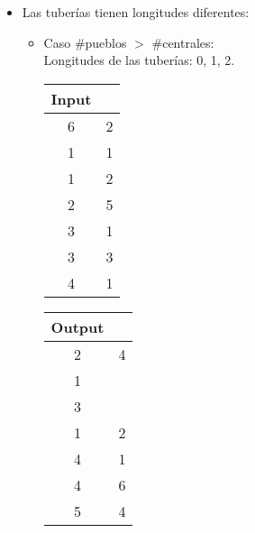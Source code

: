 \documentclass[11pt, a4paper, twoside]{article}
\begin{document}
\begin{itemize}
	\item Las tuberías tienen longitudes diferentes: 
		    \begin{itemize}
				\item Caso \#pueblos $>$ \#centrales: \\
				   Longitudes de las tuberías: 0, 1, 2. \\
				   \begin{minipage}{0.2\textwidth}
						\begin{tabular}{cc}
							   Input \\
							   \hline
							   6 & 2 \\
							   1 & 1 \\
							   1 & 2 \\
							   2 & 5 \\
							   3 & 1 \\
							   3 & 3 \\
							   4 & 1 \\
						\end{tabular}
					\end{minipage} 
					\begin{minipage}{0.2\textwidth}
						\begin{tabular}{cc}
						   Output \\
						   \hline
						   2 & 4 \\
						   1 &  \\
						   3 &  \\
						   1 & 2 \\
						   4 & 1 \\
						   4 & 6 \\
						   5 & 4 \\
						\end{tabular}
				   \end{minipage}  \\
			

\end{itemize}
\end{itemize}
\end{document}
